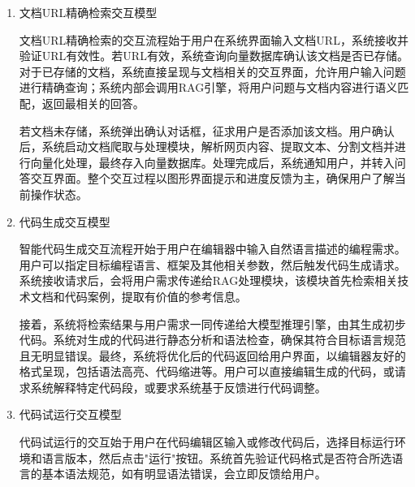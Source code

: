 \documentclass[
    report,     %
    oneside,    %
    UTF8,       %
    zihao=-4    %
]{config} %
\begin{document}
\begin{enumerate}[label=(\arabic*)]
    \item 文档URL精确检索交互模型
    
    文档URL精确检索的交互流程始于用户在系统界面输入文档URL，系统接收并验证URL有效性。若URL有效，系统查询向量数据库确认该文档是否已存储。对于已存储的文档，系统直接呈现与文档相关的交互界面，允许用户输入问题进行精确查询；系统内部会调用RAG引擎，将用户问题与文档内容进行语义匹配，返回最相关的回答。
    
    若文档未存储，系统弹出确认对话框，征求用户是否添加该文档。用户确认后，系统启动文档爬取与处理模块，解析网页内容、提取文本、分割文档并进行向量化处理，最终存入向量数据库。处理完成后，系统通知用户，并转入问答交互界面。整个交互过程以图形界面提示和进度反馈为主，确保用户了解当前操作状态。
    
    \item 代码生成交互模型
    
    智能代码生成交互流程开始于用户在编辑器中输入自然语言描述的编程需求。用户可以指定目标编程语言、框架及其他相关参数，然后触发代码生成请求。系统接收请求后，会将用户需求传递给RAG处理模块，该模块首先检索相关技术文档和代码案例，提取有价值的参考信息。
    
    接着，系统将检索结果与用户需求一同传递给大模型推理引擎，由其生成初步代码。系统对生成的代码进行静态分析和语法检查，确保其符合目标语言规范且无明显错误。最终，系统将优化后的代码返回给用户界面，以编辑器友好的格式呈现，包括语法高亮、代码缩进等。用户可以直接编辑生成的代码，或请求系统解释特定代码段，或要求系统基于反馈进行代码调整。
    
    \item 代码试运行交互模型
    
    代码试运行的交互始于用户在代码编辑区输入或修改代码后，选择目标运行环境和语言版本，然后点击"运行"按钮。系统首先验证代码格式是否符合所选语言的基本语法规范，如有明显语法错误，会立即反馈给用户。
    

\end{enumerate}
\end{document}
